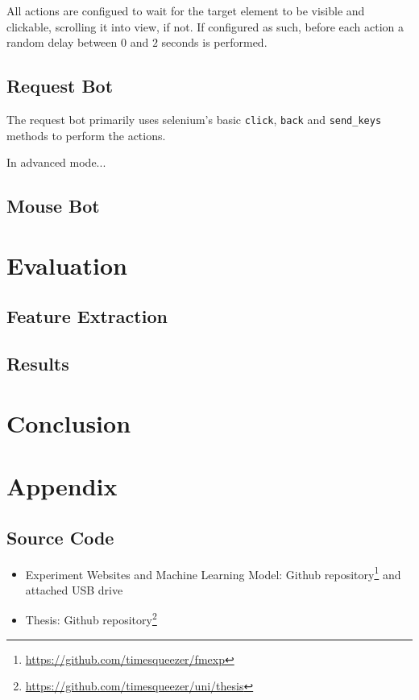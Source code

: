 \documentclass[
    fontsize=12pt,
    headings=small,
    parskip=half,           %
    bibliography=totoc,
    numbers=noenddot,       %
    open=any,               %
    final                   %
    ]{scrreprt}
\begin{document}
All actions are configued to wait for the target element to be visible and clickable, scrolling it into view, if not. If configured as such, before each action a random delay between $0$ and $2$ seconds is performed.

\section{Request Bot}

The request bot primarily uses selenium's basic \lstinline{click}, \lstinline{back} and \lstinline{send_keys} methods to perform the actions.

In advanced mode... \todo

\section{Mouse Bot}


\chapter{Evaluation}

\section{Feature Extraction}

\section{Results}

\chapter{Conclusion}

\chapter{Appendix}

\section{Source Code}

\begin{itemize}
	\item Experiment Websites and Machine Learning Model: Github repository\footnote{\url{https://github.com/timesqueezer/fmexp}} and attached USB drive
	\item Thesis: Github repository\footnote{\url{https://github.com/timesqueezer/uni/thesis}}
\end{itemize}



\begin{raggedright}
  \printbibliography
\end{raggedright}
\end{document}
